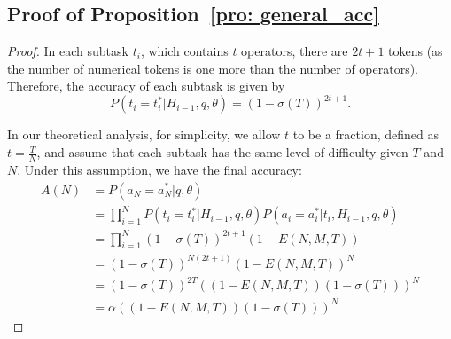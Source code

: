 \subsection{Proof of Proposition~\ref{pro: general_acc}}
\finalacc*
\begin{proof}
In each subtask \( t_i \), which contains \( t \) operators, there are \( 2t + 1 \) tokens (as the number of numerical tokens is one more than the number of operators). Therefore, the accuracy of each subtask is given by
\begin{equation}
\label{eq:task_acc}
    P(t_i= t_i^* | H_{i-1}, q, \theta) = \left(1 - \sigma(T)\right)^{2t + 1}. 
\end{equation}

In our theoretical analysis, for simplicity, we allow \( t \) to be a fraction, defined as \( t = \frac{T}{N} \), and assume that each subtask has the same level of difficulty given \( T \) and \( N \). Under this assumption, we have the final accuracy:
     \begin{align}
        A(N) &= P(a_N=a_N^*|q,\theta) \\
        &= \prod^N_{i=1}P(t_i=t_i^*|H_{i-1},q,\theta)P(a_i=a_i^*|t_i,H_{i-1},q,\theta)\\
        &= \prod^N_{i=1}\left(1 - \sigma(T)\right)^{2t + 1}\left(1-E(N,M,T)\right)\\
        &= \left(1 - \sigma(T)\right)^{N(2t + 1)}\left(1-E(N,M,T)\right)^N\\
        &= \left(1 - \sigma(T)\right)^{2T}\left((1-E(N,M,T))(1-\sigma(T))\right)^N\\
        &= \alpha\left((1-E(N,M,T))(1-\sigma(T))\right)^N
    \end{align}
\end{proof}
